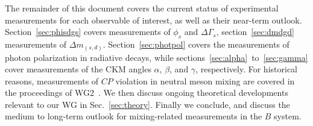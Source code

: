 The remainder of this document covers the current status of experimental measurements for each observable of
interest, as well as their near-term outlook. Section~\ref{sec:phisdgs} covers measurements of $\phi_s$ and $\Delta\Gamma_s$, section~\ref{sec:dmdgd} 
measurements of $\Delta m_{(s,d)}$. Section~\ref{sec:photpol} covers the measurements of photon polarization in radiative decays, while
sections~\ref{sec:alpha}~to~\ref{sec:gamma} cover measurements of the CKM angles $\alpha$, $\beta$, and $\gamma$, respectively.
For historical reasons, measurements of $CP$ violation in neutral meson mixing are covered in the proceedings of WG2~\cite{WG2PROC}. We then discuss
ongoing theoretical developments relevant to our WG in Sec.~\ref{sec:theory}. Finally we conclude,
and discuss the medium to long-term outlook for mixing-related measurements in the $B$ system.


